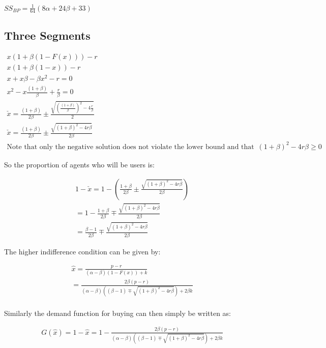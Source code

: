 \documentclass{article}
\begin{document}
$SS_{BP} = \frac{1}{64} (8 \alpha+24 \beta+33)$

\subsection{Three Segments}

\begin{align*}
x(1+\beta(1-F(x)))-r \\
x(1+\beta(1-x))-r \\
x+x\beta-\beta x^2-r=0 \\
x^2-x\frac{(1+\beta)}{\beta} +\frac{r}{\beta} = 0 \\
\check{x} = \frac{(1+\beta)}{2 \beta}
\pm
\frac{ \sqrt{ \left(\frac{(1+\beta)}{\beta}\right)^2 -4\frac{r}{\beta} } }{2} \\
\check{x} = \frac{(1+\beta)}{2 \beta}
\pm
\frac{ \sqrt{ \left(1+\beta\right)^2 -4r\beta } }{2 \beta} \\
\text{Note that only the negative solution does not violate the lower bound and that we have a condition $(1+\beta)^2-4r\beta \geq 0$}
\end{align*}

So the proportion of agents who will be users is: 

\begin{align*}
1-\check{x}=1-\left( \frac{1+\beta}{2 \beta}
\pm
\frac{ \sqrt{ \left(1+\beta\right)^2 -4r\beta } }{2 \beta} \right) \\
= 1
- \frac{1+\beta}{2 \beta}
\mp
\frac{ \sqrt{ \left(1+\beta\right)^2 -4r\beta } }{2 \beta} \\
= \frac{\beta-1}{2 \beta}
\mp
\frac{ \sqrt{ \left(1+\beta\right)^2 -4r\beta } }{2 \beta}
\end{align*}

The higher indifference condition can be given by: 

\begin{align*}
\hat{x}=\frac{p-r}{(\alpha-\beta)(1-F(x))+k} \\
=\frac{2\beta (p-r)}{(\alpha-\beta) 
\left( 
(\beta-1) \mp \sqrt{ \left(1+\beta\right)^2 -4r\beta } 
\right)+2\beta k} \\
\end{align*}

Similarly the demand function for buying can then simply be written as: 

\begin{align*}
G(\hat{x})=1-\hat{x} =1-\frac{2\beta (p-r)}{(\alpha-\beta) 
\left( 
(\beta-1) \mp \sqrt{ \left(1+\beta\right)^2 -4r\beta } 
\right)+2\beta k} 
\end{align*}
\end{document}
